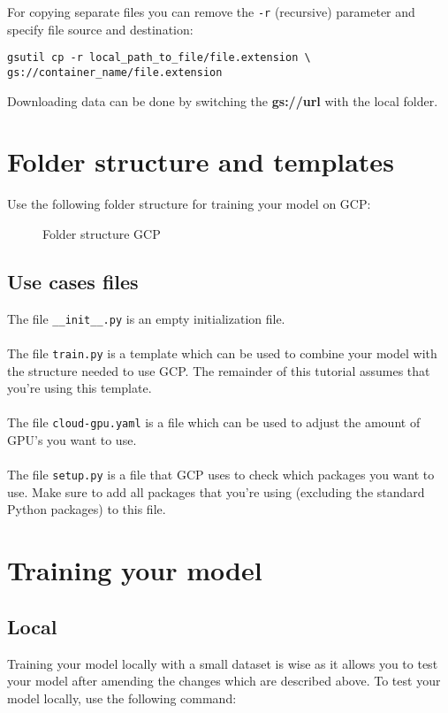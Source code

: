 \documentclass{article}
\begin{document}
For copying separate files you can remove the \texttt{-r} (recursive) parameter and specify file source and destination:
\begin{verbatim}
gsutil cp -r local_path_to_file/file.extension \
gs://container_name/file.extension
\end{verbatim}

Downloading data can be done by switching the \textbf{gs://url} with the local folder.

\section{Folder structure and templates}
Use the following folder structure for training your model on GCP:
\begin{figure}[H]
\caption{Folder structure GCP}
\label{fig:fsgcp}
\end{figure}
\subsection{Use cases files}
The file \texttt{\_\_init\_\_.py} is an empty initialization file.
\\
\\
The file \texttt{train.py} is a template which can be used to combine your model with the structure needed to use GCP. The remainder of this tutorial assumes that you're using this template.
\\
\\
The file \texttt{cloud-gpu.yaml} is a file which can be used to adjust the amount of GPU's you want to use. 
\\
\\
The file \texttt{setup.py} is a file that GCP uses to check which packages you want to use. Make sure to add all packages that you're using (excluding the standard Python packages) to this file.

\section{Training your model}
\subsection{Local}
Training your model locally with a small dataset is wise as it allows you to test your model after amending the changes which are described above. To test your model locally, use the following command:
\end{document}
